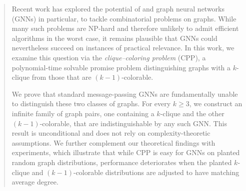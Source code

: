 \begin{abstract}
    Recent work has explored the potential of and graph neural networks (GNNs) in particular, to tackle combinatorial problems on graphs. While many such problems are NP-hard and therefore unlikely to admit efficient algorithms in the worst case, it remains plausible that GNNs could nevertheless succeed on instances of practical relevance. In this work, we examine this question via the \emph{clique--coloring problem} (CPP), a polynomial-time solvable promise problem distinguishing graphs with a $k$-clique from those that are $(k\!-\!1)$-colorable.

    We prove that standard message-passing GNNs are fundamentally unable to distinguish these two classes of graphs. For every $k \ge 3$, we construct an infinite family of graph pairs, one containing a $k$-clique and the other $(k\!-\!1)$-colorable, that are indistinguishable by any such GNN. This result is unconditional and does not rely on complexity-theoretic assumptions. We further complement our theoretical findings with experiments, which illustrate that while CPP is easy for GNNs on planted random graph distributions, performance deteriorates when the planted $k$-clique and $(k\!-\!1)$-colorable distributions are adjusted to have matching average degree.

\end{abstract}